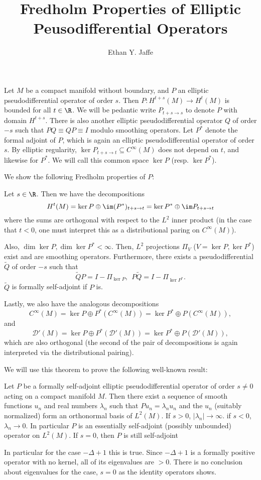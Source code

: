 \documentclass[12pt]{article}
\title{Fredholm Properties of Elliptic Peusodifferential Operators}
\author{Ethan Y. Jaffe}
\date{}
\begin{document}
\setcounter{section}{1}
\maketitle
Let $M$ be a compact manifold without boundary, and $P$ an elliptic pseudodifferential operator of order $s$. Then $P:H^{t+s}(M) \to H^{t}(M)$ is bounded for all $t \in \R$. We will be pedantic write $P_{t+s \to s}$ to denote $P$ with domain $H^{t+s}$. There is also another elliptic pseudodifferential operator $Q$ of order $-s$ such that $PQ \equiv QP \equiv I$ modulo smoothing operators. Let $P^\ast$ denote the formal adjoint of $P$, which is again an elliptic pseudodifferential operator of order $s$. By elliptic regularity, $\ker P_{t+s \to t} \subseteq C^\infty(M)$ does not depend on $t$, and likewise for $P^\ast$. We will call this common space $\ker P$ (resp. $\ker P^\ast$).

We show the following Fredholm properties of $P$:
\begin{thm}\label{one}Let $s \in \R$. Then we have the decompositions
\[H^t(M) = \ker P \oplus \im (P^\ast)_{t+s\to t} = \ker P^\ast \oplus \im P_{t+s\to t}\]
where the sums are orthogonal with respect to the $L^2$ inner product (in the case that $t < 0$, one must interpret this as a distributional paring on $C^\infty(M)$).

Also, $\dim \ker P, \dim \ker P^\ast < \infty$. Then, $L^2$ projections $\Pi_V$ ($V = \ker P,\ker P^\ast$) exist and are smoothing operators. Furthermore, there exists a pseudodifferential $\tilde{Q}$ of order $-s$ such that
\[\tilde{Q}P = I-\Pi_{\ker P}, \ \ P\tilde{Q} = I-\Pi_{\ker P^\ast}.\] $\tilde{Q}$ is formally self-adjoint if $P$ is.

Lastly, we also have the analogous decompositions
\[C^\infty(M) = \ker P \oplus P^\ast(C^\infty(M)) = \ker P^\ast \oplus P(C^\infty(M)),\]
and
\[\mathcal D'(M) = \ker P \oplus P^\ast(\mathcal D'(M)) = \ker P^\ast \oplus P(\mathcal D'(M)),\]
which are also orthogonal (the second of the pair of decompositions is again interpreted via the distributional pairing). \end{thm}

We will use this theorem to prove the following well-known result:
\begin{thm}\label{two}Let $P$ be a formally self-adjoint elliptic pseudodifferential operator of order $s \neq 0$ acting on a compact manifold $M$. Then there exist a sequence of smooth functions $u_n$ and real numbers $\lambda_n$ such that $Pu_n = \lambda_n u_n$ and the $u_n$ (suitably normalized) form an orthonormal basis of $L^2(M)$. If $s > 0$, $|\lambda_n| \to \infty$. if $s < 0$, $\lambda_n \to 0$. In particular $P$ is an essentially self-adjoint (possibly unbounded) operator on $L^2(M)$. If $s = 0$, then $P$ is still self-adjoint\end{thm}
In particular for the case $-\Delta + 1$ this is true. Since $-\Delta+1$ is a formally positive operator with no kernel, all of its eigenvalues are $> 0$. There is no conclusion about eigenvalues for the case, $s=0$ as the identity operators shows.
\end{document}
